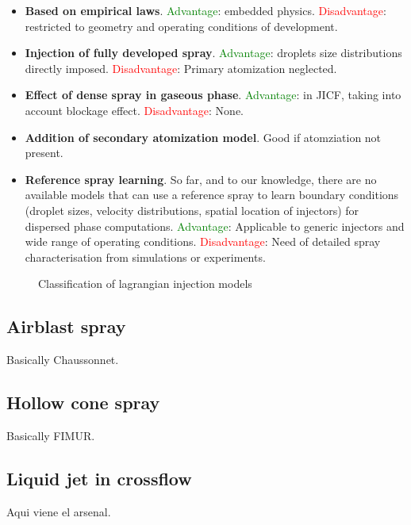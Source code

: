 \begin{itemize}

	\item \textbf{Based on empirical laws}. \textcolor{green}{Advantage}: embedded physics. \textcolor{red}{Disadvantage}: restricted to geometry and operating conditions of development.
	
	\item \textbf{Injection of fully developed spray}. \textcolor{green}{Advantage}: droplets size distributions directly imposed. \textcolor{red}{Disadvantage}: Primary atomization neglected.
	
	\item \textbf{Effect of dense spray in gaseous phase}. \textcolor{green}{Advantage}: in JICF, taking into account blockage effect. \textcolor{red}{Disadvantage}: None.
	
	\item \textbf{Addition of secondary atomization model}. Good if atomziation not present.
	
	\item \textbf{Reference spray learning}. So far, and to our knowledge, there are no available models that can use a reference spray to learn boundary conditions (droplet sizes, velocity distributions, spatial location of injectors) for dispersed phase computations. \textcolor{green}{Advantage}: Applicable to generic injectors and 
	wide range of operating conditions.  \textcolor{red}{Disadvantage}: Need of detailed spray characterisation from simulations or experiments.

\end{itemize}


\begin{figure}[h!]	
	\centering
	\caption{Classification of lagrangian injection models}
	\label{fig:state_art_injection}
\end{figure}

\subsection{Airblast spray}

Basically Chaussonnet.

\subsection{Hollow cone spray}

Basically FIMUR.

\subsection{Liquid jet in crossflow}

Aqui viene el arsenal.